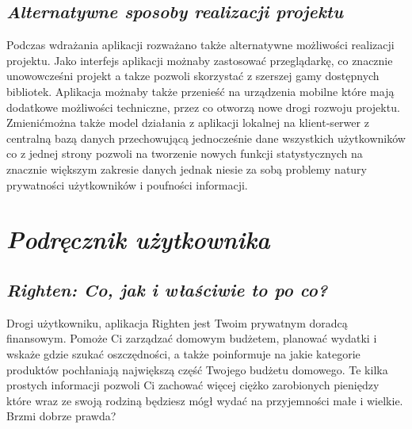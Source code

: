 \documentclass[a4paper,10pt, twoside]{report}
\newcommand{\customstylechapter}[1]{\large{\textit{#1}}}
\newcommand{\customstylesection}[1]{\textbf{\textit{#1}}}
\begin{document}
\section{\customstylesection{Alternatywne sposoby realizacji projektu}}
{Podczas wdrażania aplikacji rozważano także alternatywne możliwości realizacji 
projektu. Jako interfejs aplikacji możnaby zastosować przeglądarkę, co znacznie 
unowowcześni projekt a takze pozwoli skorzystać z szerszej gamy dostępnych 
bibliotek. Aplikacja możnaby także przenieść na urządzenia mobilne które mają 
dodatkowe możliwości techniczne, przez co otworzą nowe drogi rozwoju projektu. 
Zmienićmożna także model działania z aplikacji lokalnej na klient-serwer z 
centralną bazą danych przechowującą jednocześnie dane wszystkich użytkowników 
co z jednej strony pozwoli na tworzenie nowych funkcji statystycznych na 
znacznie większym zakresie danych jednak niesie za sobą problemy natury 
prywatności użytkowników i poufności informacji.}

\chapter{\customstylechapter{Podręcznik użytkownika}}

\section{\customstylesection{Righten: Co, jak i właściwie to po co?}}
{Drogi użytkowniku, aplikacja Righten jest Twoim prywatnym doradcą finansowym. 
Pomoże Ci zarządzać domowym budżetem, planować wydatki i wskaże gdzie szukać 
oszczędności, a także poinformuje na jakie kategorie produktów pochłaniają 
największą część Twojego budżetu domowego. Te kilka prostych informacji pozwoli 
Ci zachować więcej ciężko zarobionych pieniędzy które wraz ze swoją rodziną 
będziesz mógł wydać na przyjemności małe i wielkie. Brzmi dobrze prawda?}
\end{document}
